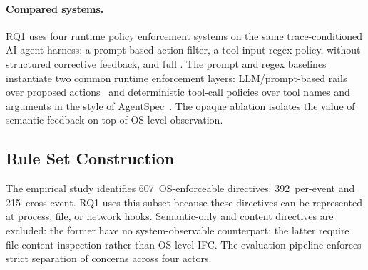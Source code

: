 \paragraph{Compared systems.}
RQ1 uses four runtime policy enforcement systems on the same
trace-conditioned AI agent harness: a prompt-based action filter, a
tool-input regex policy, \sys{} without structured corrective feedback, and
full \sys{}. The prompt and regex baselines instantiate two common
runtime enforcement layers: LLM/prompt-based rails over proposed
actions~\cite{rebedea2023nemo,xiang2025guardagent} and deterministic
tool-call policies over tool names and arguments in the style of
AgentSpec~\cite{wang2025agentspec}. The opaque ablation isolates the value
of semantic feedback on top of OS-level observation.

\subsection{Rule Set Construction}
\label{sec:eval:ruleset}

The empirical study identifies 607~OS-enforceable directives:
392~per-event and 215~cross-event. RQ1 uses this subset because these
directives can be represented at process, file, or network hooks.
Semantic-only and content directives are excluded: the former have no
system-observable counterpart; the latter require file-content inspection
rather than OS-level IFC. The evaluation pipeline enforces strict
separation of concerns across four actors.

